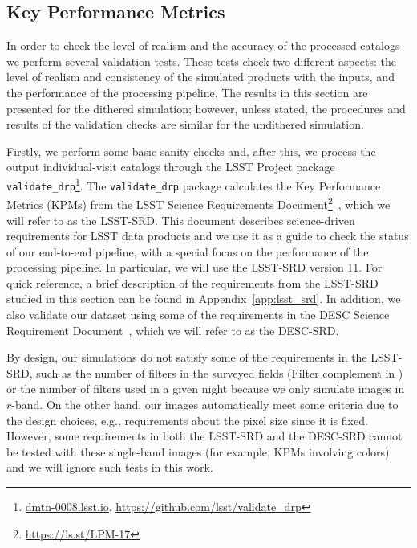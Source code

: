 \documentclass[\docopts]{\docclass}
\begin{document}
\subsection{Key Performance Metrics}

In order to check the level of realism and the accuracy of the processed catalogs we perform several validation tests. These tests check two different aspects: the level of realism and consistency of the simulated products with the inputs, and the performance of the processing pipeline. The results in this section are presented for the dithered simulation; however, unless stated, the procedures and results of the validation checks are similar for the undithered simulation.

Firstly, we perform some basic sanity checks and, after this, we process the output individual-visit catalogs through the LSST Project package \texttt{validate\_drp}\footnote{\url{dmtn-0008.lsst.io}, \url{https://github.com/lsst/validate_drp}}.
The \texttt{validate\_drp} package calculates the Key Performance Metrics (KPMs) from the LSST Science Requirements Document\footnote{\url{https://ls.st/LPM-17}}~\citep{LPM-17}, which we will refer to as the LSST-SRD. This document describes science-driven requirements for LSST data products and we use it as a guide to check the status of our end-to-end pipeline, with a special focus on the performance of the processing pipeline. In particular, we will use the LSST-SRD version 11. For quick reference, a brief description of the requirements from the LSST-SRD studied in this section can be found in Appendix~\ref{app:lsst_srd}. In addition, we also validate our dataset using some of the requirements in the DESC Science Requirement Document~\citep{2018arXiv180901669T}, which we will refer to as the DESC-SRD.
 
By design, our simulations do not satisfy some of the requirements in the LSST-SRD, such as the number of filters in the surveyed fields (Filter complement in ) or the number of filters used in a given night because we only simulate images in $r$-band. On the other hand, our images automatically meet some criteria due to the design choices, e.g., requirements about the pixel size since it is fixed. However, some requirements in both the LSST-SRD and the DESC-SRD cannot be tested with these single-band images (for example, KPMs involving colors) and we will ignore such tests in this work.
\end{document}
